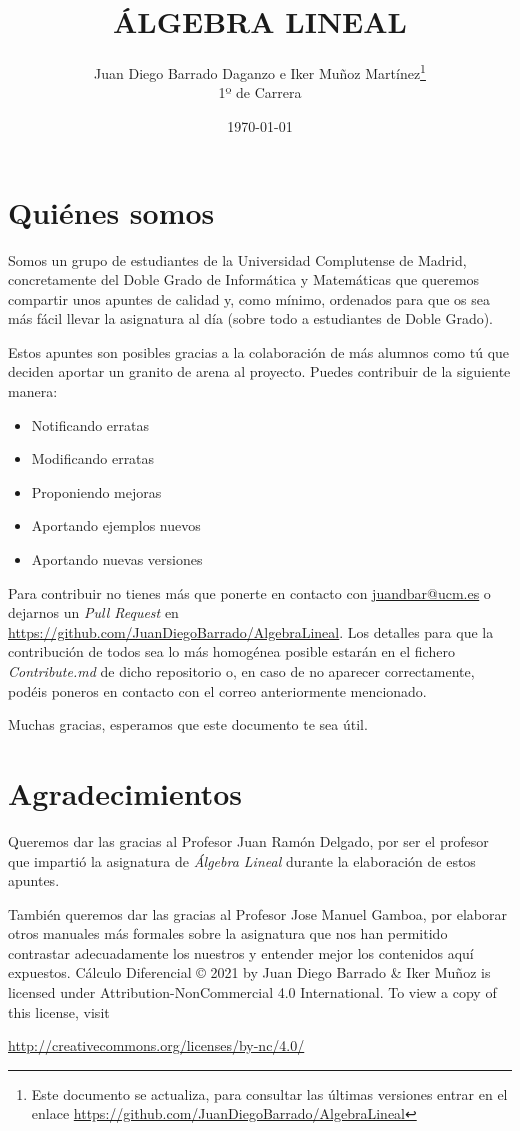 \documentclass[10pt,a4paper,openright]{book}
\title{ÁLGEBRA LINEAL}
\author{Juan Diego Barrado Daganzo e Iker Muñoz Martínez\footnote{Este documento se actualiza, para consultar las últimas versiones entrar en el enlace \url{https://github.com/JuanDiegoBarrado/AlgebraLineal}}\\1º de Carrera} %
\date{\today}
\theoremstyle{break}
\begin{document}
\maketitle
\frontmatter
\section*{Quiénes somos}
Somos un grupo de estudiantes de la Universidad Complutense de Madrid, concretamente del Doble Grado de Informática y Matemáticas que queremos compartir unos apuntes de calidad y, como mínimo, ordenados para que os sea más fácil llevar la asignatura al día (sobre todo a estudiantes de Doble Grado).

Estos apuntes son posibles gracias a la colaboración de más alumnos como tú que deciden aportar un granito de arena al proyecto. Puedes contribuir de la siguiente manera:
\begin{itemize}
\item Notificando erratas
\item Modificando erratas
\item Proponiendo mejoras
\item Aportando ejemplos nuevos
\item Aportando nuevas versiones
\end{itemize}
Para contribuir no tienes más que ponerte en contacto con \href{mailto:juandbar@ucm.es}{juandbar@ucm.es} o dejarnos un \textit{Pull Request} en \url{https://github.com/JuanDiegoBarrado/AlgebraLineal}. Los detalles para que la contribución de todos sea lo más homogénea posible estarán en el fichero \textit{Contribute.md} de dicho repositorio o, en caso de no aparecer correctamente, podéis poneros en contacto con el correo anteriormente mencionado.

Muchas gracias, esperamos que este documento te sea útil.

\section*{Agradecimientos}
Queremos dar las gracias al Profesor Juan Ramón Delgado, por ser el profesor que impartió la asignatura de \textit{Álgebra Lineal} durante la elaboración de estos apuntes.

También queremos dar las gracias al Profesor Jose Manuel Gamboa, por elaborar otros manuales más formales sobre la asignatura que nos han permitido contrastar adecuadamente los nuestros y entender mejor los contenidos aquí expuestos.
\vfill
Cálculo Diferencial © 2021 by Juan Diego Barrado \& Iker Muñoz is licensed under Attribution-NonCommercial 4.0 International. To view a copy of this license, visit
\begin{center}
\url{http://creativecommons.org/licenses/by-nc/4.0/}
\end{center}
\end{document}
